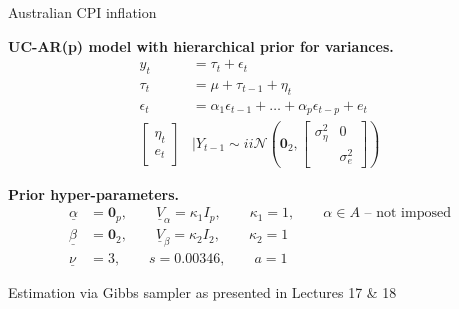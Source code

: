 \documentclass[notes,blackandwhite,mathsans,usenames,dvipsnames]{beamer}
\begin{document}
\begin{frame}{Australian CPI inflation}

\bigskip\textbf{UC-AR(p) model with hierarchical prior for variances.}
\begin{align*}
y_t &= \tau_t + \epsilon_t\\[1ex]
\tau_t &= \mu + \tau_{t-1} + \eta_t\\[1ex]
\epsilon_t &= \alpha_1\epsilon_{t-1} + \dots + \alpha_p\epsilon_{t-p} +  e_t\\[2ex]
\begin{bmatrix}\eta_t \\ e_t\end{bmatrix}&\bigg|Y_{t-1} \sim ii\mathcal{N}\left(\mathbf{0}_2, \begin{bmatrix}\sigma_\eta^2 & 0 \\  & \sigma_e^2\end{bmatrix} \right)
\end{align*}

\smallskip\textbf{Prior hyper-parameters.}
\begin{align*}
\underline\alpha &= \mathbf{0}_p,  \qquad\underline{V}_\alpha = \kappa_1I_p, \qquad\kappa_1=1, \qquad \alpha\in A\text{  -- not imposed}\\
\underline\beta &= \mathbf{0}_2,  \qquad\underline{V}_\beta = \kappa_2I_2, \qquad\kappa_2=1\\
\underline\nu &=3, \qquad s= 0.00346, \qquad a= 1
\end{align*}


{\color{mcxs2}Estimation via Gibbs sampler as presented in Lectures 17 \& 18}

\end{frame}
\end{document}
